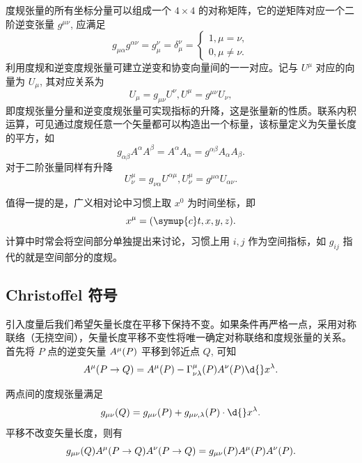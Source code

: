 \documentclass[UTF8, 12pt, a4paper, oneside, onecolumn, fontset=none]{ctexart}
\begin{document}
度规张量的所有坐标分量可以组成一个 $4\times4$ 的对称矩阵，它的逆矩阵对应一个二阶逆变张量 $g^{\mu\nu}$, 应满足
\begin{equation}
g_{\mu\alpha}g^{\alpha\nu}=g^{\nu}_{\mu}=\delta_{\mu}^{\nu}=
\begin{cases}
1,\mu=\nu,\\
0,\mu\ne\nu.
\end{cases}
\end{equation}
利用度规和逆变度规张量可建立逆变和协变向量间的一一对应。记与 $U^{\mu}$ 对应的向量为 $U_{\mu}$, 其对应关系为
\begin{equation}
U_{\mu}=g_{\mu\nu}U^{\nu}, U^{\mu}=g^{\mu\nu}U_{\nu},
\end{equation}
即度规张量分量和逆变度规张量可实现指标的升降，这是张量新的性质。联系内积运算，可见通过度规任意一个矢量都可以构造出一个标量，该标量定义为矢量长度的平方，如
\begin{equation}
g_{\alpha\beta}A^{\alpha}A^{\beta}=A^{\alpha}A_{\alpha}=g^{\alpha\beta}A_{\alpha}A_{\beta}.
\end{equation}
对于二阶张量同样有升降
\begin{equation}
U_{\nu}^{\mu}=g_{\nu\alpha}U^{\alpha\mu}, U_{\nu}^{\mu}=g^{\mu\alpha}U_{\alpha\nu}.
\end{equation}

值得一提的是，广义相对论中习惯上取 $x^{0}$ 为时间坐标，即
\begin{equation}
x^{\mu}=\mleft(\symup{c}t, x, y, z\mright).
\end{equation}
计算中时常会将空间部分单独提出来讨论，习惯上用 $i, j$ 作为空间指标，如 $g_{ij}$ 指代的就是空间部分的度规。

\subsection{Christoffel 符号}
引入度量后我们希望矢量长度在平移下保持不变。如果条件再严格一点，采用对称联络（无挠空间），矢量长度平移不变性将唯一确定对称联络和度规张量的关系。首先将 $P$ 点的逆变矢量 $A^{\mu}\mleft(P\mright)$ 平移到邻近点 $Q$, 可知
\begin{equation}
A^{\mu}\mleft(P\to Q\mright)=A^{\mu}\mleft(P\mright)-\Gamma_{\nu\lambda}^{\mu}\mleft(P\mright) A^{\nu}\mleft(P\mright)\d{}x^{\lambda}.\label{1.7.1}
\end{equation}

两点间的度规张量满足
\begin{equation}
g_{\mu\nu}\mleft(Q\mright)=g_{\mu\nu}\mleft(P\mright)+g_{\mu\nu,\lambda}\mleft(P\mright)\cdot\d{}x^{\lambda}.\label{1.7.2}
\end{equation}
平移不改变矢量长度，则有
\begin{equation}
g_{\mu\nu}\mleft(Q\mright) A^{\mu}\mleft(P\to Q\mright) A^{\nu}\mleft(P\to Q\mright)=g_{\mu\nu}\mleft(P\mright) A^{\mu}\mleft(P\mright) A^{\nu}\mleft(P\mright).\label{1.7.3}
\end{equation}
\end{document}
